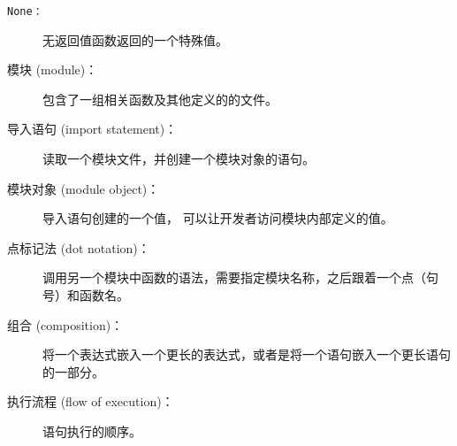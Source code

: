 \begin{description}
\item[\tt None：] 无返回值函数返回的一个特殊值。
  
  


\item[模块 (module)：] 包含了一组相关函数及其他定义的的文件。


\item[导入语句 (import statement)：] 读取一个模块文件，并创建一个模块对象的语句。
  
  


\item[模块对象 (module object)：] 导入语句创建的一个值， 可以让开发者访问模块内部定义的值。
  


\item[点标记法 (dot notation)：] 调用另一个模块中函数的语法，需要指定模块名称，之后跟着一个点（句号）和函数名。
  


\item[组合 (composition)：] 将一个表达式嵌入一个更长的表达式，或者是将一个语句嵌入一个更长语句的一部分。
  


\item[执行流程 (flow of execution)：] 语句执行的顺序。
  


\end{description}
